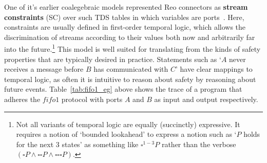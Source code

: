 One of it's earlier coalegebraic models represented Reo connectors as \textbf{stream constraints} (SC) over such TDS tables in which variables are ports~\cite{arbab2004reo}. Here, constraints are usually defined in first-order temporal logic, which allows the discrimination of streams according to their values both now and arbitrarily far into the future.\footnote{Not all variants of temporal logic are equally (succinctly) expressive. It requires a notion of `bounded lookahead' to express a notion such as `$P$ holds for the next 3 states' as something like $\square ^{1-3} P$ rather than the verbose $(\square P \wedge \square \square P \wedge \square \square \square P)$.} This model is well suited for translating from the kinds of safety properties that are typically desired in practice. Statements such as `$A$ never receives a message before $B$ has communicated with $C$' have clear mappings to temporal logic, as often it is intuitive to reason about safety by reasoning about future events. Table~\ref{tab:fifo1_eg} above shows the trace of a program that adheres the $fifo1$ protocol with ports $A$ and $B$ as input and output respectively.

